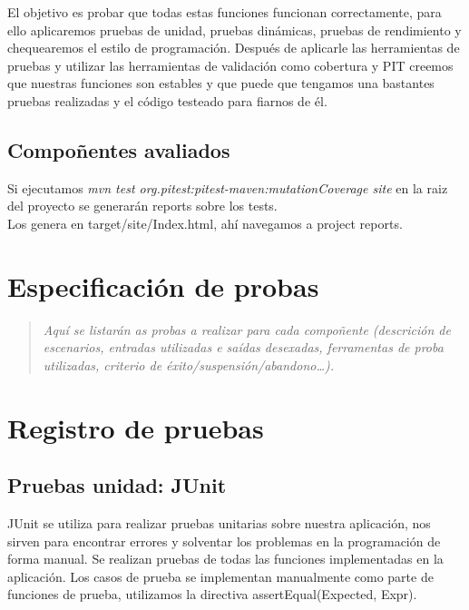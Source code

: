 \documentclass[DIV=calc,paper=a4,fontsize=11pt,onecolumn]{scrartcl} %
\newcommand{\hint}[1]{\begin{quote}\itshape #1 \end{quote}}
\begin{document}
	El objetivo es probar que todas estas funciones funcionan correctamente, para ello aplicaremos pruebas de unidad, pruebas dinámicas, pruebas de rendimiento y chequearemos el estilo de programación.
	Después de aplicarle las herramientas de pruebas y utilizar las herramientas de validación como cobertura y PIT creemos que nuestras funciones son estables y que puede que tengamos una bastantes pruebas realizadas y el código testeado para fiarnos de él. 

\subsection{Compoñentes avaliados}

Si ejecutamos \textit{mvn test org.pitest:pitest-maven:mutationCoverage site} en la raiz del proyecto se generarán reports sobre los tests. \\

Los genera en target/site/Index.html, ahí navegamos a project reports. \\

\section{Especificación de probas}

\hint{Aquí se listarán as probas a realizar para cada compoñente
  (descrición de escenarios, entradas utilizadas e saídas desexadas,
  ferramentas de proba utilizadas, criterio de
  éxito/suspensión/abandono\dots). }

	\section{Registro de pruebas}
	\subsection{Pruebas unidad: JUnit}
	JUnit se utiliza para realizar pruebas unitarias sobre nuestra aplicación, nos sirven para encontrar errores y solventar los problemas en la programación de forma manual.
	Se realizan pruebas de todas las funciones implementadas en la aplicación.
	Los casos de prueba se implementan manualmente como parte de funciones de prueba, utilizamos la directiva assertEqual(Expected, Expr).
\end{document}
